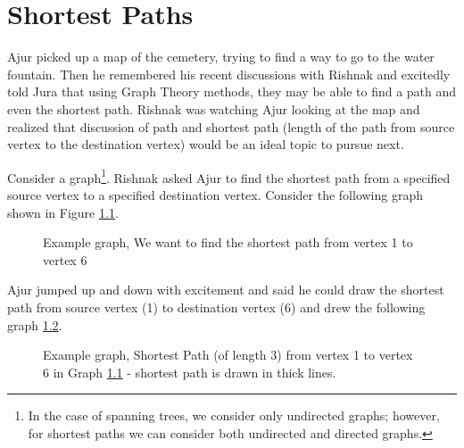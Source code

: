 \chapter{Shortest Paths}
Ajur picked up a map of the cemetery,  trying to find a way to go to the water fountain. Then he remembered his recent discussions with Rishnak and excitedly told Jura that using Graph Theory methods, they may be able to find a path and even the shortest path. Rishnak was watching Ajur looking at the map and realized that discussion of path and shortest path (length of the path from source vertex to the destination vertex) would be an ideal topic to pursue next.

Consider a graph\footnote{In the case of spanning trees, we consider only undirected graphs; however, for shortest paths we can consider both undirected and directed graphs.}. Rishnak asked Ajur to find the shortest path from a specified source vertex to a specified destination vertex. Consider the following graph shown in Figure \ref{12g1}.
\begin{figure}
\begin{center}
\caption{ Example graph, We want to find the shortest path from vertex 1 to vertex 6}\label{12g1}
\end{center}
\end{figure}

Ajur jumped up and down with excitement and said he could draw the shortest path from source vertex (1) to destination vertex (6) and drew the following graph \ref{12g2}.

\begin{figure}
\begin{center}
\caption{ Example graph, Shortest Path (of length 3) from vertex 1 to vertex 6 in Graph \ref{12g1} - shortest path is drawn in thick lines.}\label{12g2}
\end{center}
\end{figure}

